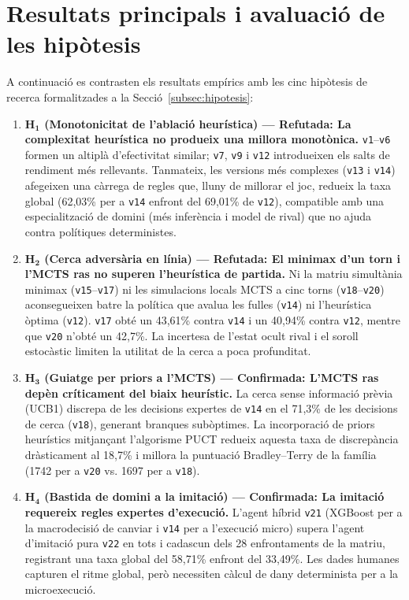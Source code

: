 \section{Resultats principals i avaluació de les hipòtesis}
\label{sec:resultats_principals_hipotesis}

A continuació es contrasten els resultats empírics amb les cinc hipòtesis de recerca formalitzades a la Secció~\ref{subsec:hipotesis}:

\begin{enumerate}
    \item \textbf{$\mathbf{H_1}$ (Monotonicitat de l'ablació heurística) --- Refutada: La complexitat heurística no produeix una millora monotònica.} \texttt{v1}--\texttt{v6} formen un altiplà d'efectivitat similar; \texttt{v7}, \texttt{v9} i \texttt{v12} introdueixen els salts de rendiment més rellevants. Tanmateix, les versions més complexes (\texttt{v13} i \texttt{v14}) afegeixen una càrrega de regles que, lluny de millorar el joc, redueix la taxa global (62,03\% per a \texttt{v14} enfront del 69,01\% de \texttt{v12}), compatible amb una especialització de domini (més inferència i model de rival) que no ajuda contra polítiques deterministes.
    \item \textbf{$\mathbf{H_2}$ (Cerca adversària en línia) --- Refutada: El minimax d'un torn i l'MCTS ras no superen l'heurística de partida.} Ni la matriu simultània minimax (\texttt{v15}--\texttt{v17}) ni les simulacions locals MCTS a cinc torns (\texttt{v18}--\texttt{v20}) aconsegueixen batre la política que avalua les fulles (\texttt{v14}) ni l'heurística òptima (\texttt{v12}). \texttt{v17} obté un 43,61\% contra \texttt{v14} i un 40,94\% contra \texttt{v12}, mentre que \texttt{v20} n'obté un 42,7\%. La incertesa de l'estat ocult rival i el soroll estocàstic limiten la utilitat de la cerca a poca profunditat.
    \item \textbf{$\mathbf{H_3}$ (Guiatge per priors a l'MCTS) --- Confirmada: L'MCTS ras depèn críticament del biaix heurístic.} La cerca sense informació prèvia (UCB1) discrepa de les decisions expertes de \texttt{v14} en el 71,3\% de les decisions de cerca (\texttt{v18}), generant branques subòptimes. La incorporació de priors heurístics mitjançant l'algorisme PUCT redueix aquesta taxa de discrepància dràsticament al 18,7\% i millora la puntuació Bradley--Terry de la família (1742 per a \texttt{v20} vs. 1697 per a \texttt{v18}).
    \item \textbf{$\mathbf{H_4}$ (Bastida de domini a la imitació) --- Confirmada: La imitació requereix regles expertes d'execució.} L'agent híbrid \texttt{v21} (XGBoost per a la macrodecisió de canviar i \texttt{v14} per a l'execució micro) supera l'agent d'imitació pura \texttt{v22} en tots i cadascun dels 28 enfrontaments de la matriu, registrant una taxa global del 58,71\% enfront del 33,49\%. Les dades humanes capturen el ritme global, però necessiten càlcul de dany determinista per a la microexecució.

\end{enumerate}
